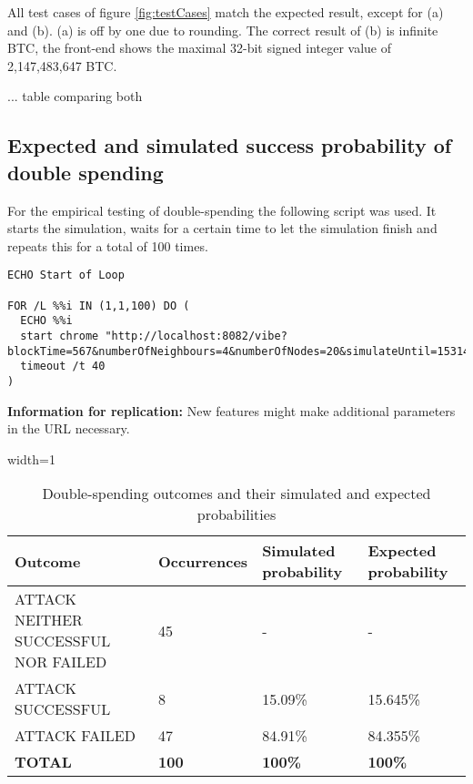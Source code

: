 All test cases of figure \ref{fig:testCases} match the expected result, except for (a) and (b). (a) is off by one due to rounding. The correct result of (b) is infinite BTC, the front-end shows the maximal 32-bit signed integer value of 2,147,483,647 BTC.

... table comparing both

\subsection{Expected and simulated success probability of double spending}
\label{subsection:evalDoubleSpending}

For the empirical testing of double-spending the following script was used. It starts the simulation, waits for a certain time to let the simulation finish and repeats this for a total of 100 times.

\begin{minipage}{\linewidth}
\begin{lstlisting}[style=batch]
ECHO Start of Loop

FOR /L %%i IN (1,1,100) DO (
  ECHO %%i
  start chrome "http://localhost:8082/vibe?blockTime=567&numberOfNeighbours=4&numberOfNodes=20&simulateUntil=1531411943382&transactionSize=1&throughput=105&latency=900&neighboursDiscoveryInterval=3000&maxBlockSize=100&maxBlockWeight=4000&networkBandwidth=1&strategy=BITCOIN_LIKE_BLOCKCHAIN&transactionPropagationDelay=150&hashRate=30&confirmations=6"
  timeout /t 40
)
\end{lstlisting}
\end{minipage}

\textbf{Information for replication:} New features might make additional parameters in the URL necessary.

\begin{table}[ht]

\begin{adjustbox}{width=1\textwidth}
    \begin{tabular}{| l | l | l | l |}
    \hline
    \textbf{Outcome} & \textbf{Occurrences} & \textbf{Simulated probability} & \textbf{Expected probability} \\ \hline
    ATTACK NEITHER SUCCESSFUL NOR FAILED & 45 & - & - \\ \hline
    ATTACK SUCCESSFUL & 8 & 15.09\% & 15.645\% \\ \hline
    ATTACK FAILED & 47 & 84.91\% & 84.355\% \\ \hline
    \textbf{TOTAL} & \textbf{100} & \textbf{100\%} & \textbf{100\%} \\ \hline
    \end{tabular}
\end{adjustbox}
    \caption{Double-spending outcomes and their simulated and expected probabilities\label{table:doubleSpendingSimulatedAndExpected}}
\end{table} 


